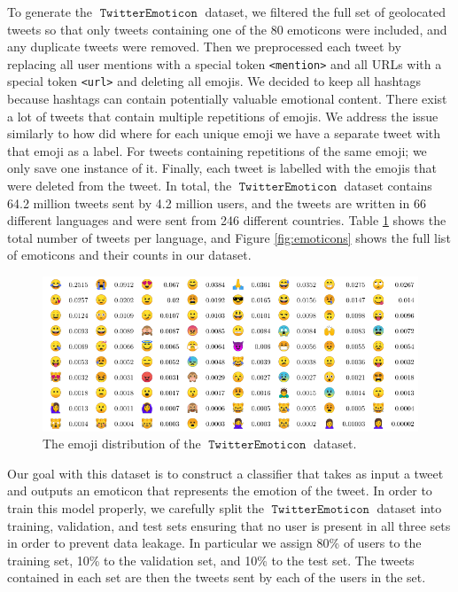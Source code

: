 \documentclass[11pt]{article}
\DeclareMathOperator{\emoticon}{\texttt{TwitterEmoticon}}
\begin{document}
To generate the $\emoticon$ dataset, 
we filtered the full set of geolocated tweets so that only tweets containing one of the 80 emoticons were included,
and any duplicate tweets were removed.
Then we preprocessed each tweet by replacing all user mentions with a special token \texttt{<mention>} and all URLs with a special token \texttt{<url>} and deleting all emojis.
We decided to keep all hashtags because hashtags can contain potentially valuable emotional content.
There exist a lot of tweets that contain multiple repetitions of emojis.
We address the issue similarly to how \cite{100_million_tweets} did where for each unique emoji we have a separate tweet with that emoji as a label. 
For tweets containing repetitions of the same emoji; we only save one instance of it.
Finally, each tweet is labelled with the emojis that were deleted from the tweet.
In total, the $\emoticon$ dataset contains 64.2 million tweets sent by 4.2 million users,
and the tweets are written in 66 different languages and were sent from 246 different countries.
Table \ref{table:lang} shows the total number of tweets per language,
and Figure \ref{fig:emoticons} shows the full list of emoticons and their counts in our dataset. 

\begin{figure}[ht]
    \centering
    \includegraphics[scale = 1.2]{images/emojitable.pdf}
    \caption{The emoji distribution of the $\emoticon$ dataset.} 
    \label{table:lang}
\end{figure}

Our goal with this dataset is to construct a classifier that takes as input a tweet and outputs an emoticon that represents the emotion of the tweet.
In order to train this model properly,
we carefully split the $\emoticon$ dataset into training, validation, and test sets ensuring that no user is present in all three sets in order to prevent data leakage.
In particular we assign 80\% of users to the training set, 10\% to the validation set, and 10\% to the test set.
The tweets contained in each set are then the tweets sent by each of the users in the set.
\end{document}
